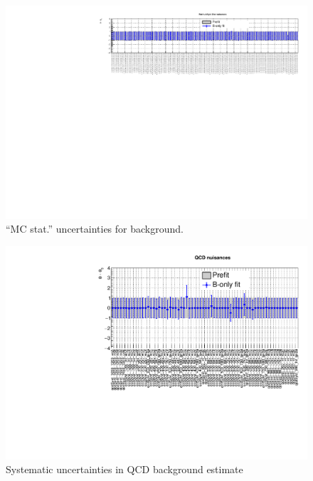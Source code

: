\begin{figure}[h!]
  \centering
  \caption{``MC stat.'' uncertainties for \znunuj background.}
  \includegraphics[width=1.\linewidth]{figures/results/36invfb_preapproval/postfit/nuis/FormulaSystZinv_nuisances}
\end{figure}

\clearpage
\begin{figure}[h!]
  \centering
  \caption{Systematic uncertainties in QCD background estimate}
  \includegraphics[width=1.\linewidth]{figures/results/36invfb_preapproval/postfit/nuis/qcd_nuisances}
\end{figure}

